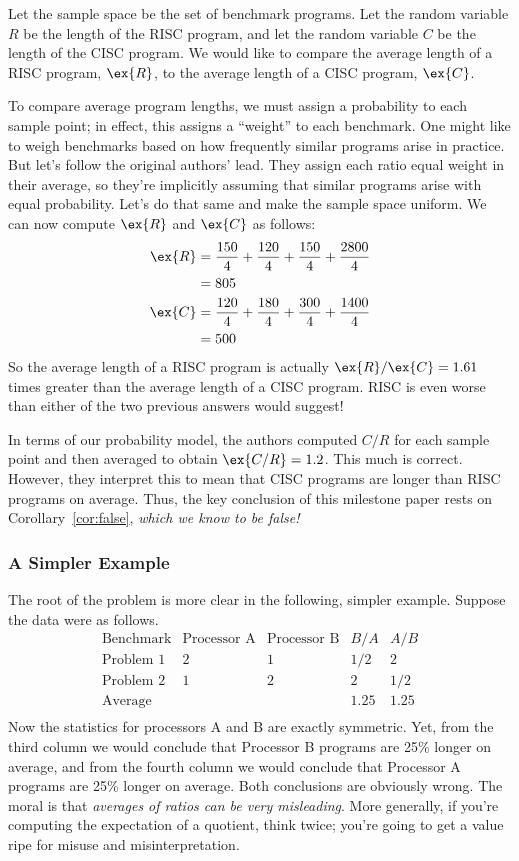 \documentclass[12pt,twoside]{article}
\begin{document}
Let the sample space be the set of benchmark programs.  Let the random
variable $R$ be the length of the RISC program, and let the random
variable $C$ be the length of the CISC program.  We would like to
compare the average length of a RISC program, $\ex{R}$, to the average
length of a CISC program, $\ex{C}$.

To compare average program lengths, we must assign a probability to
each sample point; in effect, this assigns a ``weight'' to each
benchmark.  One might like to weigh benchmarks based on how frequently
similar programs arise in practice.  But let's follow the original
authors' lead.  They assign each ratio equal weight in their average,
so they're implicitly assuming that similar programs arise with equal
probability.  Let's do that same and make the sample space uniform.
We can now compute $\ex{R}$ and $\ex{C}$ as follows:
%
\begin{align*}
\ex{R}	& = 	\frac{150}{4}+\frac{120}{4}+\frac{150}{4}+\frac{2800}{4} \\
	& = 	805 \\
\ex{C}	& = 	\frac{120}{4}+\frac{180}{4}+\frac{300}{4}+\frac{1400}{4} \\
	& = 	500
\end{align*}
%
So the average length of a RISC program is actually $\ex{R}/\ex{C} =
1.61$ times greater than the average length of a CISC program.  RISC
is even worse than either of the two previous answers would suggest!

In terms of our probability model, the authors computed $C / R$ for
each sample point and then averaged to obtain $\ex{C / R} = 1.2$.
This much is correct.  However, they interpret this to mean that CISC
programs are longer than RISC programs on average.  Thus, the key
conclusion of this milestone paper rests on Corollary~\ref{cor:false},
\textit{which we know to be false!}

\subsubsection{A Simpler Example}

The root of the problem is more clear in the following, simpler
example.  Suppose the data were as follows.
%
\[
\begin{array}{lcccc}
\text{Benchmark}	& \text{Processor A}	& \text{Processor B}
			& B / A			& A / B \\
\hline
\text{Problem 1}	& 2			& 1		
			& 1/2			& 2 \\
\text{Problem 2}	& 1			& 2
			& 2			& 1/2 \\
\hline
\text{Average}		&			&
			& 1.25			& 1.25 \\
\end{array}
\]
%
Now the statistics for processors A and B are exactly symmetric.  Yet,
from the third column we would conclude that Processor B programs are
25\% longer on average, and from the fourth column we would conclude
that Processor A programs are 25\% longer on average.  Both
conclusions are obviously wrong.  The moral is that \textit{averages
of ratios can be very misleading}.  More generally, if you're
computing the expectation of a quotient, think twice; you're going to
get a value ripe for misuse and misinterpretation.
\end{document}
